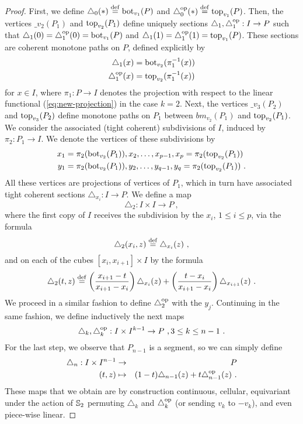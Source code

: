 \begin{proof}
    First, we define $\triangle_0 (*) \stackrel{\mathrm{def}}{=} \operatorname{bot}_{v_1}(P)$ and $\triangle_0^{\mathrm{op}} (*) \stackrel{\mathrm{def}}{=} \operatorname{top}_{v_1}(P)$.
    Then, the vertices $\bm_{v_2}(P_1)$ and $\operatorname{top}_{v_2}(P_1)$ define uniquely sections $\triangle_1, \triangle_1^{\mathrm{op}} : I \to P$ such that $\triangle_1(0)=\triangle_1^{\mathrm{op}}(0)=\operatorname{bot}_{v_1}(P)$ and $\triangle_1(1)=\triangle_1^{\mathrm{op}}(1)=\operatorname{top}_{v_1}(P)$.
    These sections are coherent monotone paths on $P$, defined explicitly by 
    \begin{align*}
        \triangle_1(x) & = \operatorname{bot}_{v_2}(\pi_1^{-1}(x)) \\
        \triangle_1^{\mathrm{op}}(x) & = \operatorname{top}_{v_2}(\pi_1^{-1}(x)) 
    \end{align*}
    for $x \in I$, where $\pi_1 : P \to I$ denotes the projection with respect to the linear functional (\ref{eq:new-projection}) in the case $k=2$. 
    Next, the vertices $\bm_{v_3}(P_2)$ and $\operatorname{top}_{v_3}(P_2)$ define monotone paths on $P_1$ between $bm_{v_2}(P_1)$ and $\operatorname{top}_{v_2}(P_1)$. 
    We consider the associated (tight coherent) subdivisions of $I$, induced by $\pi_2 : P_1 \to I$.
    We denote the vertices of these subdivisions by 
    \begin{align*}
        x_1 & =\pi_2(\operatorname{bot}_{v_2}(P_1)), x_2, \ldots, x_{p-1}, x_p=\pi_2(\operatorname{top}_{v_2}(P_1)) \\
        y_1 & = \pi_2(\operatorname{bot}_{v_2}(P_1)), y_2, \ldots, y_{q-1}, y_q=\pi_2(\operatorname{top}_{v_2}(P_1)) \ .
    \end{align*}
    All these vertices are projections of vertices of $P_1$, which in turn have associated tight coherent sections $\triangle_{x_i}: I \to P$. 
    We define a map 
    \[ 
    \triangle_2 : I \times I \to P \ ,
    \]
    where the first copy of $I$ receives the subdivision by the $x_i$, $1\leq i \leq p$, via the formula 
    \[ 
        \triangle_2(x_i, z) \stackrel{\mathrm{def}}{=} \triangle_{x_i}(z) \ ,
    \]
    and on each of the cubes $[x_i,x_{i+1}]\times I$ by the formula 
    \[
    \triangle_2(t,z) \stackrel{\mathrm{def}}{=} \left( \frac{x_{i+1}-t}{x_{i+1}-x_i} \right) \triangle_{x_i}(z) + \left( \frac{t-x_i}{x_{i+1}-x_i} \right) \triangle_{x_{i+1}}(z) \ .
    \]
    We proceed in a similar fashion to define $\triangle_2^{\mathrm{op}}$ with the $y_j$. 
    Continuing in the same fashion, we define inductively the next maps
    \[ 
    \triangle_k, \triangle_k^{\mathrm{op}} : I \times I^{k-1} \to P \ , 3 \leq k \leq n-1 \ .
    \]
    For the last step, we observe that $P_{n-1}$ is a segment, so we can simply define 
    \begin{eqnarray*}
        \triangle_n : I \times I^{n-1} & \to & P \\
        (t,z) & \mapsto & (1-t)\triangle_{n-1}(z) + t \triangle_{n-1}^{\mathrm{op}} (z) \ .
    \end{eqnarray*}
    These maps that we obtain are by construction continuous, cellular, equivariant under the action of $\mathbb{S}_2$ permuting $\triangle_k$ and $\triangle_k^{\mathrm{op}}$ (or sending $v_k$ to $-v_k$), and even piece-wise linear. 
\end{proof}


